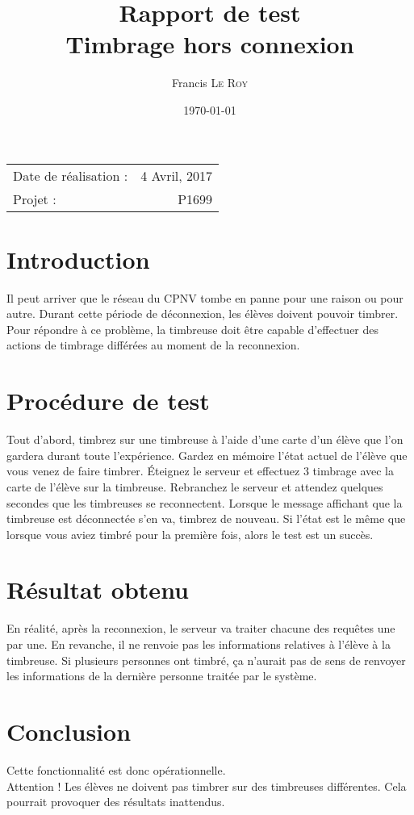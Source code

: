 \documentclass[10pt,a4paper,onecolumn]{article}
\title{Rapport de test \\ Timbrage hors connexion}
\author{Francis \textsc{Le Roy}}
\date{\today}
\begin{document}
\maketitle
\thispagestyle{fancy}

\begin{center}
\begin{tabular}{l r}
Date de réalisation : & 4 Avril, 2017 \\
Projet : & P1699 \\
\end{tabular}
\end{center}

\section{Introduction}
Il peut arriver que le réseau du CPNV tombe en panne pour une raison ou pour autre. Durant cette période de déconnexion, les élèves doivent pouvoir timbrer. Pour répondre à ce problème, la timbreuse doit être capable d'effectuer des actions de timbrage différées au moment de la reconnexion.
\section{Procédure de test}
Tout d'abord, timbrez sur une timbreuse à l'aide d'une carte d'un élève que l'on gardera durant toute l'expérience. Gardez en mémoire l'état actuel de l'élève que vous venez de faire timbrer. Éteignez le serveur et effectuez 3 timbrage avec la carte de l'élève sur la timbreuse. Rebranchez le serveur et attendez quelques secondes que les timbreuses se reconnectent. Lorsque le message affichant que la timbreuse est déconnectée s'en va, timbrez de nouveau. Si l'état est le même que lorsque vous aviez timbré pour la première fois, alors le test est un succès.
\section{Résultat obtenu}
En réalité, après la reconnexion, le serveur va traiter chacune des requêtes une par une. En revanche, il ne renvoie pas les informations relatives à l'élève à la timbreuse. Si plusieurs personnes ont timbré, ça n'aurait pas de sens de renvoyer les informations de la dernière personne traitée par le système.
\section{Conclusion}
Cette fonctionnalité est donc opérationnelle.\\
{\color{red}Attention ! Les élèves ne doivent pas timbrer sur des timbreuses différentes. Cela pourrait provoquer des résultats inattendus.}
\end{document}
